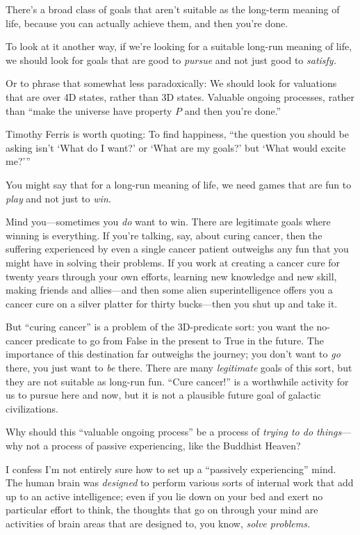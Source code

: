 {
 There's a broad class of goals that
aren't suitable as the long-term meaning of life,
because you can actually achieve them, and then you're
done.}

{
 To look at it another way, if we're looking for a
suitable long-run meaning of life, we should look for goals that are
good to \textit{pursue} and not just good to \textit{satisfy.}}

{
 Or to phrase that somewhat less paradoxically: We should look for
valuations that are over 4D states, rather than 3D states. Valuable
ongoing processes, rather than ``make the universe
have property $P$ and then you're
done.''}

{
 Timothy Ferris is worth quoting: To find happiness,
``the question you should be asking
isn't `What do I want?'
or `What are my goals?' but
`What would excite
me?'''}

{
 You might say that for a long-run meaning of life, we need games
that are fun to \textit{play} and not just to \textit{win.}}

{
 Mind you---sometimes you \textit{do} want to win. There are
legitimate goals where winning is everything. If you're
talking, say, about curing cancer, then the suffering experienced by
even a single cancer patient outweighs any fun that you might have in
solving their problems. If you work at creating a cancer cure for
twenty years through your own efforts, learning new knowledge and new
skill, making friends and allies---and then some alien
superintelligence offers you a cancer cure on a silver platter for
thirty bucks---then you shut up and take it.}

{
 But ``curing cancer'' is a
problem of the 3D-predicate sort: you want the no-cancer predicate to
go from False in the present to True in the future. The importance of
this destination far outweighs the journey; you don't
want to \textit{go} there, you just want to \textit{be} there. There
are many \textit{legitimate} goals of this sort, but they are not
suitable as long-run fun. ``Cure
cancer!'' is a worthwhile activity for us to pursue
here and now, but it is not a plausible future goal of galactic
civilizations.}

{
 Why should this ``valuable ongoing
process'' be a process of \textit{trying to do
things}{}---why not a process of passive experiencing, like the
Buddhist Heaven?}

{
 I confess I'm not entirely sure how to set up a
``passively experiencing'' mind. The
human brain was \textit{designed} to perform various sorts of internal
work that add up to an active intelligence; even if you lie down on
your bed and exert no particular effort to think, the thoughts that go
on through your mind are activities of brain areas that are designed
to, you know, \textit{solve problems.}}

